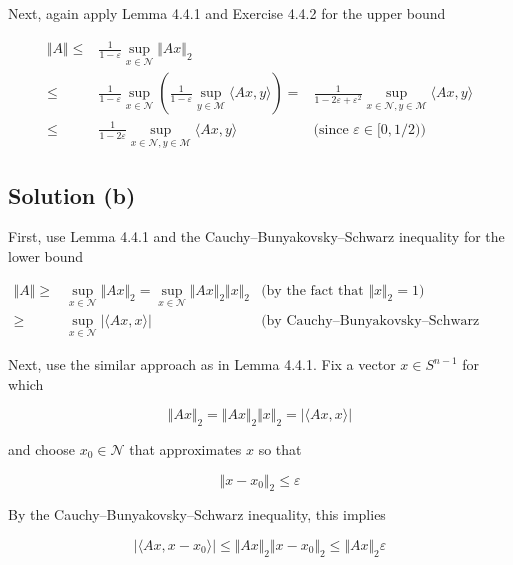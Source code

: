 \documentclass{article}
\begin{document}
Next, again apply Lemma 4.4.1 and Exercise 4.4.2 for the upper bound

\begin{equation*}
    \begin{aligned}
        \Vert A \Vert \leq & \frac{1}{1-\varepsilon}\sup_{x \in \mathcal N} \Vert Ax \Vert_2 \\
        \leq & \frac{1}{1-\varepsilon}\sup_{x \in \mathcal N}\left( \frac{1}{1-\varepsilon} \sup_{y \in \mathcal M} \langle Ax, y \rangle \right) = &\frac{1}{1 - 2\varepsilon + \varepsilon^2}\sup_{x \in \mathcal N, y \in \mathcal M}\langle Ax, y \rangle \\
        \leq & \frac{1}{1-2\varepsilon}\sup_{x \in \mathcal N, y \in \mathcal M}\langle Ax, y \rangle &\text{(since $\varepsilon \in [0,1/2)$)}
    \end{aligned}
\end{equation*}

\subsection{Solution (b)}

First, use Lemma 4.4.1 and the Cauchy–Bunyakovsky–Schwarz inequality for the lower bound

\begin{equation*}
    \begin{aligned}
        \Vert A \Vert \geq & \sup_{x \in \mathcal N} \Vert A x \Vert_2 = \sup_{x \in \mathcal N} \Vert Ax \Vert_2 \Vert x \Vert_2 &\text{(by the fact that $\Vert x \Vert_2 = 1$)} \\
        \geq & \sup_{x \in \mathcal N} | \langle Ax,  x \rangle | &\text{(by Cauchy–Bunyakovsky–Schwarz inequality)}
    \end{aligned}
\end{equation*}

Next, use the similar approach as in Lemma 4.4.1. Fix a vector $x \in S^{n-1}$ for which

$$\Vert Ax \Vert_2 = \Vert Ax \Vert_2 \Vert x \Vert_2 = |\langle Ax, x \rangle|$$

and choose $x_0 \in \mathcal N$ that approximates $x$ so that

$$\Vert x - x_0 \Vert_2 \leq \varepsilon$$

By the Cauchy–Bunyakovsky–Schwarz inequality, this implies

$$|\langle Ax, x - x_0 \rangle| \leq \Vert Ax \Vert_2 \Vert x - x_0 \Vert_2 \leq \Vert Ax \Vert_2 \varepsilon$$
\end{document}
